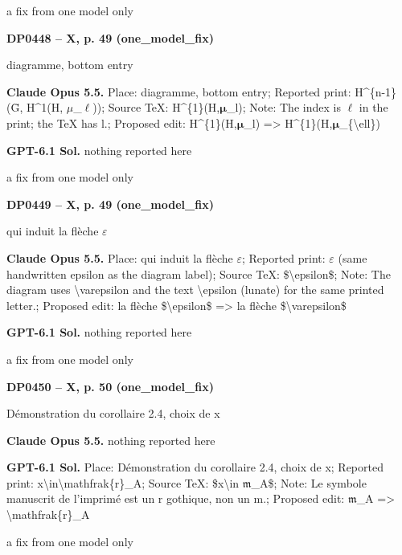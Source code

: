 a fix from one model only\par
\par\noindent\hypertarget{DP0448}{}\textbf{DP0448 -- X, p. 49 (one\_model\_fix)}\par
diagramme, bottom entry\par
\textbf{Claude Opus 5.5.} Place: diagramme, bottom entry; Reported print: H\textasciicircum{}\{n-1\}(Ḡ, H\textasciicircum{}1(H, \ensuremath{\mu}\_\ensuremath{\ell})); Source TeX: H\textasciicircum{}\{1\}(H,\ensuremath{𝛍}\_l); Note: The index is \ensuremath{\ell} in the print; the TeX has l.; Proposed edit: H\textasciicircum{}\{1\}(H,\ensuremath{𝛍}\_l) =\allowbreak > H\textasciicircum{}\{1\}(H,\ensuremath{𝛍}\_\{\textbackslash{}ell\})\par
\textbf{GPT-6.1 Sol.} nothing reported here\par
a fix from one model only\par
\par\noindent\hypertarget{DP0449}{}\textbf{DP0449 -- X, p. 49 (one\_model\_fix)}\par
qui induit la flèche \ensuremath{\varepsilon}\par
\textbf{Claude Opus 5.5.} Place: qui induit la flèche \ensuremath{\varepsilon}; Reported print: \ensuremath{\varepsilon} (same handwritten epsilon as the diagram label); Source TeX: \$\textbackslash{}epsilon\$; Note: The diagram uses \textbackslash{}varepsilon and the text \textbackslash{}epsilon (lunate) for the same printed letter.; Proposed edit: la flèche \$\textbackslash{}epsilon\$ =\allowbreak > la flèche \$\textbackslash{}varepsilon\$\par
\textbf{GPT-6.1 Sol.} nothing reported here\par
a fix from one model only\par
\par\noindent\hypertarget{DP0450}{}\textbf{DP0450 -- X, p. 50 (one\_model\_fix)}\par
Démonstration du corollaire 2.4, choix de x\par
\textbf{Claude Opus 5.5.} nothing reported here\par
\textbf{GPT-6.1 Sol.} Place: Démonstration du corollaire 2.4, choix de x; Reported print: x\textbackslash{}in\textbackslash{}mathfrak\{r\}\_A; Source TeX: \$x\textbackslash{}in \ensuremath{𝔪}\_A\$; Note: Le symbole manuscrit de l'imprimé est un r gothique, non un m.; Proposed edit: \ensuremath{𝔪}\_A =\allowbreak > \textbackslash{}mathfrak\{r\}\_A\par
a fix from one model only\par
